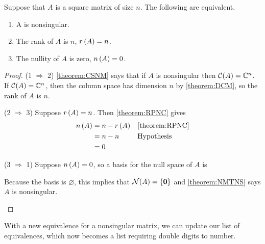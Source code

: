 \documentclass{ximera}
\begin{document}
\begin{theorem}
  \label{theorem:RNNM}
  
  Suppose that $A$ is a square matrix of size $n$.  The following are equivalent.
  \begin{enumerate}
  \item A is nonsingular.
  \item The rank of $A$ is $n$, $r\left(A\right)=n$.
  \item The nullity of $A$ is zero, $n\left(A\right)=0$.
  \end{enumerate}

  \begin{proof}
    (1 $\Rightarrow$ 2) \ref{theorem:CSNM} says that if $A$ is
    nonsingular then $\mathcal{C}\!\left(A\right)=\mathbb{C}^{n}$.  If $\mathcal{C}\!\left(A\right)=\mathbb{C}^{n}$,
    then the column space has dimension $n$ by \ref{theorem:DCM}, so
    the rank of $A$ is $n$.

    (2 $\Rightarrow$ 3)  Suppose $r\left(A\right)=n$.  Then \ref{theorem:RPNC} gives
    \begin{align*}
      n\left(A\right)&=n-r\left(A\right)&&\ref{theorem:RPNC}\\
                 &=n-n&&\text{Hypothesis}\\
                 &=0
    \end{align*}

    (3 $\Rightarrow$ 1) Suppose $n\left(A\right)=0$, so a basis for the
    null space of $A$ is 
    \begin{multipleChoice}
    \end{multipleChoice}
    
    \begin{feedback}[correct]
      Because the basis is $\varnothing$, this implies that
      $\mathcal{N}\!\left(A\right)=\left\{\mathbf{0}\right\}$ and \ref{theorem:NMTNS} says $A$ is
      nonsingular.
    \end{feedback}
  \end{proof}
\end{theorem}

With a new equivalence for a nonsingular matrix, we can update our
list of equivalences, which now becomes a list requiring double digits
to number.
\end{document}
